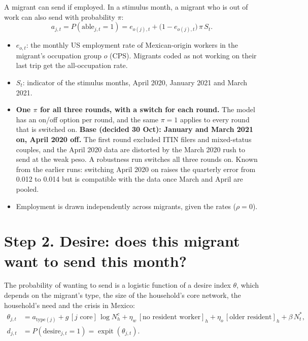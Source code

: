 \documentclass[11pt]{article}
\newcommand{\expit}{\operatorname{expit}}
\begin{document}
A migrant can send if employed. In a stimulus month, a migrant who is out of work can also send with probability $\pi$:
\begin{equation}
a_{j,t} = P(\text{able}_{j,t} = 1) = e_{o(j),t} + \big(1 - e_{o(j),t}\big)\,\pi\,S_t .
\end{equation}

\begin{itemize}[leftmargin=*]
\item $e_{o,t}$: the monthly US employment rate of Mexican-origin workers in the migrant's occupation group $o$ (CPS). Migrants coded as not working on their last trip get the all-occupation rate.
\item $S_t$: indicator of the stimulus months, April 2020, January 2021 and March 2021.
\item \textbf{One $\pi$ for all three rounds, with a switch for each round.} The model has an on/off option per round, and the same $\pi = 1$ applies to every round that is switched on. \textbf{Base (decided 30 Oct): January and March 2021 on, April 2020 off.} The first round excluded ITIN filers and mixed-status couples, and the April 2020 data are distorted by the March 2020 rush to send at the weak peso. A robustness run switches all three rounds on. Known from the earlier runs: switching April 2020 on raises the quarterly error from 0.012 to 0.014 but is compatible with the data once March and April are pooled.
\item Employment is drawn independently across migrants, given the rates ($\rho = 0$).
\end{itemize}

\section*{Step 2. Desire: does this migrant want to send this month?}

The probability of wanting to send is a logistic function of a desire index $\theta$, which depends on the migrant's type, the size of the household's core network, the household's need and the crisis in Mexico:
\begin{align}
\theta_{j,t} &= a_{\text{type}(j)} + g\,[j \text{ core}]\,\log N^c_h + \eta_w\,[\text{no resident worker}]_h + \eta_o\,[\text{older resident}]_h + \beta\,N^*_t, \\
d_{j,t} &= P(\text{desire}_{j,t} = 1) = \expit(\theta_{j,t}).
\end{align}
\end{document}
